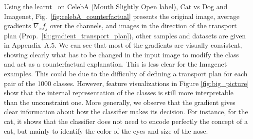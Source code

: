 Using the learnt \otnn~on  CelebA (Mouth Slightly Open label), Cat vs Dog and Imagenet, Fig.~\ref{fig:celebA_counterfactual}  presents the original image, average gradients $\nabla_x f_j$  over the channels, and images in the direction of the transport plan (Prop.~\ref{th:gradient_transport_plan}), other samples and datasets are given in Appendix~A.5. 
We can see that most of the gradients are visually consistent, showing clearly what has to be changed in the input image to modify the class and act as a counterfactual explanation. 
This is less clear for the Imagenet examples. This could be due to the difficulty of defining a transport plan for each pair of the 1000 classes. However, feature visualizations in Figure \ref{fig:big_picture} show that the internal representation of the classes is still more interpretable than the unconstraint one. 
More generally, we observe that the gradient gives clear information about how the classifier makes its decision. For instance, for the cat, it shows that the classifier does not need to encode perfectly the concept of a cat, but mainly to identify the color of the eyes and size of the nose.

